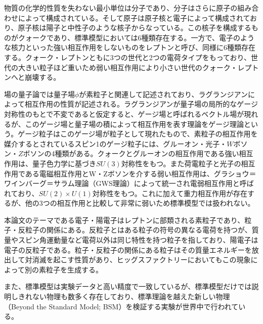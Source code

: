物質の化学的性質を失わない最小単位は分子であり、分子はさらに原子の組み合わせによって構成されている。そして原子は原子核と電子によって構成されており、原子核は陽子と中性子のような核子からなっている。この核子を構成するものがクォークであり、標準模型においては6種類存在する。一方で、電子のような核力といった強い相互作用をしないものをレプトンと呼び、同様に6種類存在する。クォーク・レプトンともに3つの世代と2つの電荷タイプをもっており、世代の大きい粒子ほど重いため弱い相互作用により小さい世代のクォーク・レプトンへと崩壊する。

場の量子論では量子場$\phi$が素粒子と関連して記述されており、ラグランジアンによって相互作用の性質が記述される。ラグランジアンが量子場の局所的なゲージ対称性のもとで不変であると仮定すると、ゲージ場と呼ばれるベクトル場が現れるが、このゲージ場と量子場の積によって相互作用を表す理論をゲージ理論という。ゲージ粒子はこのゲージ場が粒子として現れたもので、素粒子の相互作用を媒介するとされているスピン1のゲージ粒子には、グルーオン・光子・$W$ボソン・$Z$ボソンの4種類がある。クォークとグルーオンの相互作用である強い相互作用は、量子色力学に基づき$SU(3)$対称性をもつ。また荷電粒子と光子の相互作用である電磁相互作用とW・Zボソンを介する弱い相互作用は、グラショウ＝ワインバーグ＝サラム理論（GWS理論）\cite{gws}によって統一され電弱相互作用と呼ばれており、$SU(2)\times U(1)$対称性をもつ。これに加えて重力相互作用が存在するが、他の3つの相互作用と比較して非常に弱いため標準模型では扱われない。

本論文のテーマである電子・陽電子はレプトンに部類される素粒子であり、粒子・反粒子の関係にある。反粒子とはある粒子の符号の異なる電荷を持つが、質量やスピン角運動量など電荷以外は同じ特性を持つ粒子を指しており、陽電子は電子の反粒子である。粒子・反粒子の関係にある粒子はその質量エネルギーを放出して対消滅を起こす性質があり、ヒッグスファクトリーにおいてもこの現象によって別の素粒子を生成する。

また、標準模型は実験データと高い精度で一致しているが、標準模型だけでは説明しきれない物理も数多く存在しており、標準理論を越えた新しい物理（Beyond the Standard Model; BSM）を検証する実験が世界中で行われている。

